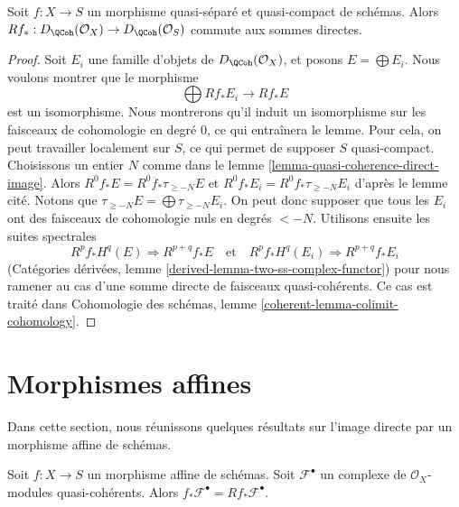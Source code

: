 \begin{lemma}
\label{lemma-quasi-coherence-pushforward-direct-sums}
Soit $f : X \to S$ un morphisme quasi-séparé et quasi-compact de
schémas. Alors
$Rf_* : D_\QCoh(\mathcal{O}_X) \to D_\QCoh(\mathcal{O}_S)$
commute aux sommes directes.
\end{lemma}

\begin{proof}
Soit $E_i$ une famille d'objets de $D_\QCoh(\mathcal{O}_X)$,
et posons $E = \bigoplus E_i$. Nous voulons montrer que le morphisme
$$
\bigoplus Rf_*E_i \longrightarrow Rf_*E
$$
est un isomorphisme. Nous montrerons qu'il induit un isomorphisme sur les
faisceaux de cohomologie en degré $0$, ce qui entraînera le lemme.
Pour cela, on peut travailler localement sur $S$, ce qui permet de
supposer $S$ quasi-compact.
Choisissons un entier $N$ comme dans le lemme \ref{lemma-quasi-coherence-direct-image}.
Alors $R^0f_*E = R^0f_*\tau_{\geq -N}E$ et
$R^0f_*E_i = R^0f_*\tau_{\geq -N}E_i$ d'après le lemme cité. Notons que
$\tau_{\geq -N}E = \bigoplus \tau_{\geq -N}E_i$.
On peut donc supposer que tous les $E_i$ ont des faisceaux de cohomologie
nuls en degrés $< -N$. Utilisons ensuite les suites spectrales
$$
R^pf_*H^q(E) \Rightarrow R^{p + q}f_*E
\quad\text{et}\quad
R^pf_*H^q(E_i) \Rightarrow R^{p + q}f_*E_i
$$
(Catégories dérivées, lemme \ref{derived-lemma-two-ss-complex-functor})
pour nous ramener au cas d'une somme directe de faisceaux quasi-cohérents.
Ce cas est traité dans
Cohomologie des schémas, lemme \ref{coherent-lemma-colimit-cohomology}.
\end{proof}








\section{Morphismes affines}
\label{section-affine-morphisms}

\noindent
Dans cette section, nous réunissons quelques résultats sur l'image directe
par un morphisme affine de schémas.

\begin{lemma}
\label{lemma-pushforward-affine-morphism}
Soit $f : X \to S$ un morphisme affine de schémas. Soit $\mathcal{F}^\bullet$
un complexe de $\mathcal{O}_X$-modules quasi-cohérents. Alors
$f_*\mathcal{F}^\bullet = Rf_*\mathcal{F}^\bullet$.
\end{lemma}

